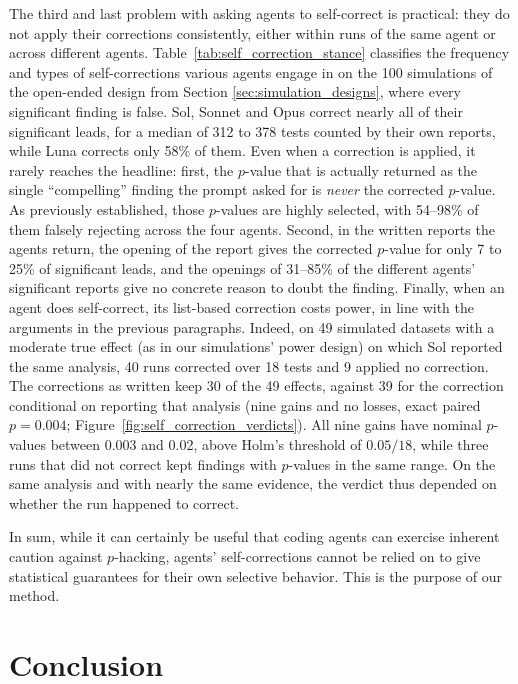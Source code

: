 \documentclass[10pt]{article}
\begin{document}
The third and last problem with asking agents to self-correct is practical: they do not apply their corrections consistently, either within runs of the same agent or across different agents. Table~\ref{tab:self_correction_stance} classifies the frequency and types of self-corrections various agents engage in on the 100 simulations of the open-ended design from Section \ref{sec:simulation_designs}, where every significant finding is false. Sol, Sonnet and Opus correct nearly all of their significant leads, for a median of 312 to 378 tests counted by their own reports, while Luna corrects only 58\% of them. Even when a correction is applied, it rarely reaches the headline: first, the $p$-value that is actually returned as the single ``compelling'' finding the prompt asked for is \textit{never} the corrected $p$-value. As previously established, those $p$-values are highly selected, with 54--98\% of them falsely rejecting across the four agents. Second, in the written reports the agents return, the opening of the report gives the corrected $p$-value for only 7 to 25\% of significant leads, and the openings of 31--85\% of the different agents' significant reports give no concrete reason to doubt the finding. Finally, when an agent does self-correct, its list-based correction costs power, in line with the arguments in the previous paragraphs. Indeed, on 49 simulated datasets with a moderate true effect (as in our simulations' power design) on which Sol reported the same analysis, 40 runs corrected over 18 tests and 9 applied no correction. The corrections as written keep 30 of the 49 effects, against 39 for the correction conditional on reporting that analysis (nine gains and no losses, exact paired $p=0.004$; Figure~\ref{fig:self_correction_verdicts}). All nine gains have nominal $p$-values between 0.003 and 0.02, above Holm's threshold of $0.05/18$, while three runs that did not correct kept findings with $p$-values in the same range. On the same analysis and with nearly the same evidence, the verdict thus depended on whether the run happened to correct.

In sum, while it can certainly be useful that coding agents can exercise inherent caution against $p$-hacking, agents' self-corrections cannot be relied on to give statistical guarantees for their own selective behavior. This is the purpose of our method.

\FloatBarrier
\section{Conclusion}
\end{document}
